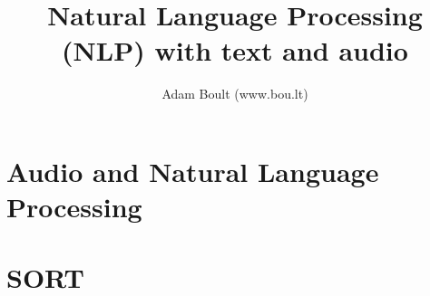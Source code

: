 \documentclass[oneside]{book}
\begin{document}
\author{Adam Boult (www.bou.lt)}
\title{Natural Language Processing (NLP) with text and audio}
\maketitle

\setcounter{tocdepth}{0}
\tableofcontents



\part{Audio and Natural Language Processing}




\part{SORT}

\end{document}
